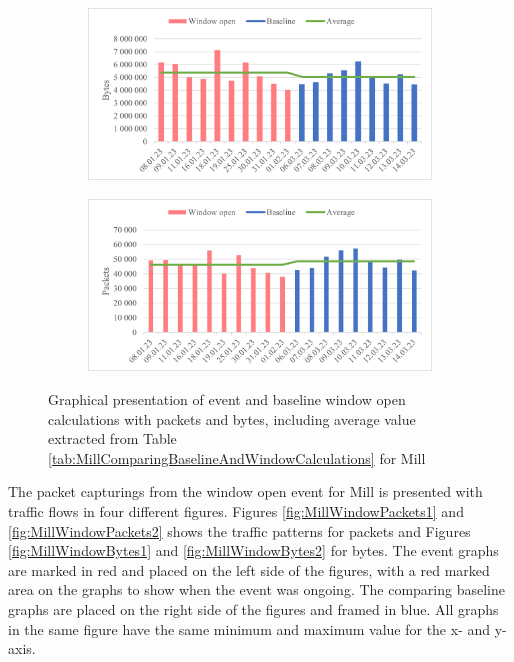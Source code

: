 \begin{figure}[H]
    \centering
    \begin{subfigure}{0.8\textwidth}
        \centering
        \includegraphics[width=1\hsize]{figures/Mill_Window_Calculations_Bytes.png} 
    \end{subfigure}
    \begin{subfigure}{0.8\textwidth}
        \centering
        \includegraphics[width=1\hsize]{figures/Mill_Window_Calculations_Packets.png} 
    \end{subfigure}
    \caption{Graphical presentation of event and baseline window open calculations with packets and bytes, including average value extracted from Table \ref{tab:MillComparingBaselineAndWindowCalculations} for Mill}
    \label{fig:MillWindowCalculations}
\end{figure}

The packet capturings from the window open event for Mill is presented with traffic flows in four different figures. Figures \ref{fig:MillWindowPackets1} and \ref{fig:MillWindowPackets2} shows the traffic patterns for packets and Figures \ref{fig:MillWindowBytes1} and \ref{fig:MillWindowBytes2} for bytes. The event graphs are marked in red and placed on the left side of the figures, with a red marked area on the graphs to show when the event was ongoing. The comparing baseline graphs are placed on the right side of the figures and framed in blue. All graphs in the same figure have the same minimum and maximum value for the x- and y-axis. 

